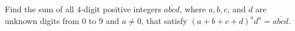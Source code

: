 Find the sum of all $4$-digit positive integers $\overline{abcd}$, where $a, b, c$, and $d$ are unknown digits from $0$ to $9$ and $a \ne 0$, that satisfy $(a + b + c + d)^a d^a = \overline{abcd}$.
